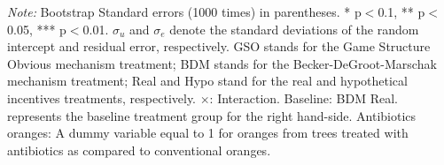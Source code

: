 \documentclass[12pt]{article}
\begin{document}
\begin{table}[H]
\begin{tablenotes}
            \footnotesize
           \item \textit{Note:} Bootstrap Standard errors (1000 times) in parentheses. * p$<$0.1, ** p$<$0.05, *** p$<$0.01.  $\sigma_u$ and $\sigma_e$ denote the standard deviations of the random intercept and residual error, respectively.  GSO stands for the Game Structure Obvious mechanism treatment; BDM stands for the Becker-DeGroot-Marschak mechanism treatment; Real and Hypo stand for the real and hypothetical incentives treatments, respectively. $\times$: Interaction. Baseline: BDM Real. represents the baseline treatment group for the right hand-side. Antibiotics oranges: A dummy variable equal to 1 for oranges from trees treated with antibiotics as compared to conventional oranges.
        \end{tablenotes}
\end{table}
\end{document}
